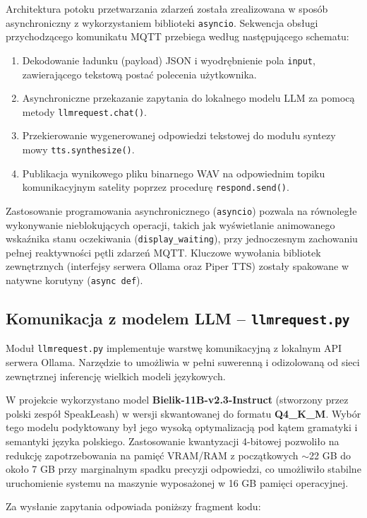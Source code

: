 \documentclass[12pt,a4paper]{article}
\begin{document}
Architektura potoku przetwarzania zdarzeń została zrealizowana w sposób asynchroniczny z wykorzystaniem biblioteki \texttt{asyncio}. Sekwencja obsługi przychodzącego komunikatu MQTT przebiega według następującego schematu:
\begin{enumerate}
    \item Dekodowanie ładunku (payload) JSON i wyodrębnienie pola \texttt{input}, zawierającego tekstową postać polecenia użytkownika.
    \item Asynchroniczne przekazanie zapytania do lokalnego modelu LLM za pomocą metody \texttt{llmrequest.chat()}.
    \item Przekierowanie wygenerowanej odpowiedzi tekstowej do modułu syntezy mowy \texttt{tts.synthesize()}.
    \item Publikacja wynikowego pliku binarnego WAV na odpowiednim topiku komunikacyjnym satelity poprzez procedurę \texttt{respond.send()}.
\end{enumerate}

Zastosowanie programowania asynchronicznego (\texttt{asyncio}) pozwala na równoległe wykonywanie nieblokujących operacji, takich jak wyświetlanie animowanego wskaźnika stanu oczekiwania (\texttt{display\_waiting}), przy jednoczesnym zachowaniu pełnej reaktywności pętli zdarzeń MQTT. Kluczowe wywołania bibliotek zewnętrznych (interfejsy serwera Ollama oraz Piper TTS) zostały spakowane w natywne korutyny (\texttt{async def}).

\subsection{Komunikacja z modelem LLM – \texttt{llmrequest.py}}
Moduł \texttt{llmrequest.py} implementuje warstwę komunikacyjną z lokalnym API serwera Ollama. Narzędzie to umożliwia w pełni suwerenną i odizolowaną od sieci zewnętrznej inferencję wielkich modeli językowych.

W projekcie wykorzystano model \textbf{Bielik-11B-v2.3-Instruct} (stworzony przez polski zespół SpeakLeash) w wersji skwantowanej do formatu \textbf{Q4\_K\_M}. Wybór tego modelu podyktowany był jego wysoką optymalizacją pod kątem gramatyki i semantyki języka polskiego. Zastosowanie kwantyzacji 4-bitowej pozwoliło na redukcję zapotrzebowania na pamięć VRAM/RAM z początkowych $\sim$22 GB do około 7 GB przy marginalnym spadku precyzji odpowiedzi, co umożliwiło stabilne uruchomienie systemu na maszynie wyposażonej w 16 GB pamięci operacyjnej.

Za wysłanie zapytania odpowiada poniższy fragment kodu:
\end{document}
